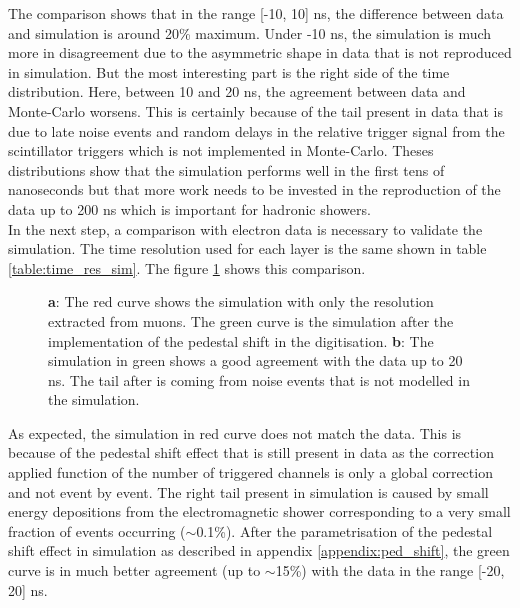\documentclass[twoside,a4paper,11pt]{article}
\begin{document}
The comparison shows that in the range [-10, 10] ns, the difference between data and simulation is around 20\% maximum. Under -10 ns, the simulation is much more in disagreement due to the asymmetric shape in data that is not reproduced in simulation. But the most interesting part is the right side of the time distribution. Here, between 10 and 20 ns, the agreement between data and Monte-Carlo worsens. This is certainly because of the tail present in data that is due to late noise events and random delays in the relative trigger signal from the scintillator triggers which is not implemented in Monte-Carlo. Theses distributions show that the simulation performs well in the first tens of nanoseconds but that more work needs to be invested in the reproduction of the data up to 200 ns which is important for hadronic showers.\\
In the next step, a comparison with electron data is necessary to validate the simulation. The time resolution used for each layer is the same shown in table \ref{table:time_res_sim}. The figure \ref{fig:sim_data_elec} shows this comparison.
\begin{figure}[htbp]
	\caption[]{\textbf{a}: The red curve shows the simulation with only the resolution extracted from muons. The green curve is the simulation after the implementation of the pedestal shift in the digitisation. \textbf{b}: The simulation in green shows a good agreement with the data up to 20 ns. The tail after is coming from noise events that is not modelled in the simulation.}
	\label{fig:sim_data_elec}
\end{figure}
As expected, the simulation in red curve does not match the data. This is because of the pedestal shift effect that is still present in data as the correction applied function of the number of triggered channels is only a global correction and not event by event. The right tail present in simulation is caused by small energy depositions from the electromagnetic shower corresponding to a very small fraction of events occurring ($\sim$0.1\%).
After the parametrisation of the pedestal shift effect in simulation as described in appendix \ref{appendix:ped_shift}, the green curve is in much better agreement (up to $\sim$15\%) with the data in the range [-20, 20] ns.
\end{document}
